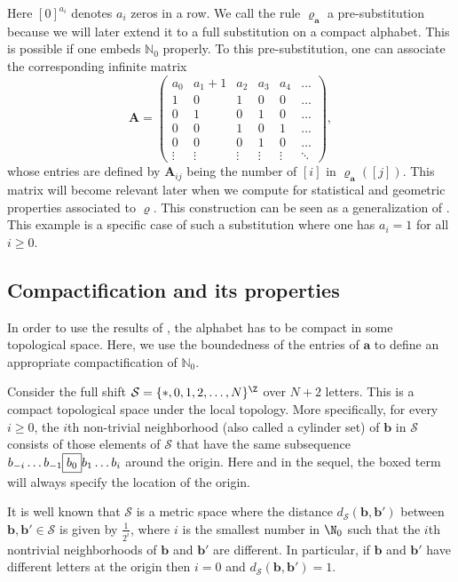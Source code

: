 Here $[0]^{a_i}$ denotes $a_i$ zeros in a row.
We call the rule $\varrho^{ }_{\mathbf{a}}$ a pre-substitution because we will later extend it to a full substitution on a compact alphabet. This is possible if one embeds $\mathbb{N}_0$ properly. 
To this pre-substitution, one can associate the corresponding infinite matrix 
$$\mathbf A=\left( 
\begin{array}{cccccc}
a_0& a_1+1& a_2 & a_3 & a_4 & \dots\\
1 & 0 & 1 & 0 & 0 & \ldots\\
0 & 1 & 0 & 1 & 0 & \ldots\\
0 & 0 & 1 & 0 & 1 & \ldots\\
0 & 0 & 0 & 1 & 0 & \ldots\\
\vdots & \vdots & \vdots & \vdots & \vdots & \ddots
\end{array}
\right),$$
whose entries are defined by $\mathbf{A}_{ij}$ being the number of $[i]$ in $\varrho_{\mathbf{a}}([j])$. This matrix will become relevant later when we compute for statistical and geometric properties associated to $\varrho$. 
This construction can be seen as a generalization of \cite[Sec~4.4]{MRW}. This example is a specific case of such a substitution where one has $a_i=1$ for all $i\geq 0$.



\subsection{Compactification and its properties}%

In order to use the results of \cite{MRW2}, the alphabet has to be compact in some topological space. Here, we use the boundedness of the entries of $\mathbf{a}$ to define an appropriate compactification of $\mathbb{N}_0$. 


Consider the full shift $\mathcal S=\{*,0,1,2,\ldots,N\}^\Z$ over $N+2$ letters. This is a compact topological space under the local topology.  More specifically, for every $i\geq 0$, the $i$th non-trivial neighborhood (also called a cylinder set) of $\mathbf b$ in $\mathcal S$ consists of those elements of $\mathcal S$ that have the same subsequence $b_{-i}\ldots b_{-1}\fbox{$b_0$}b_1\ldots b_{i}$ around the origin. Here and in the sequel, the boxed term will always specify the location of the origin. 

%

It is well known that $\mathcal S$ is a metric space where the distance $d_\mathcal S(\mathbf b,\mathbf b')$ between $\mathbf b,\mathbf b'\in \mathcal S$ is given by $\frac{1}{2^{i}}$, where $i$ is the smallest number in  $\N_0$ such that the $i$th nontrivial neighborhoods of $\mathbf b$ and $\mathbf b'$ are different. In particular, if $\mathbf b$ and $\mathbf b'$ have different letters at the origin then $i=0$ and $d_\mathcal S(\mathbf b,\mathbf b')=1$.

